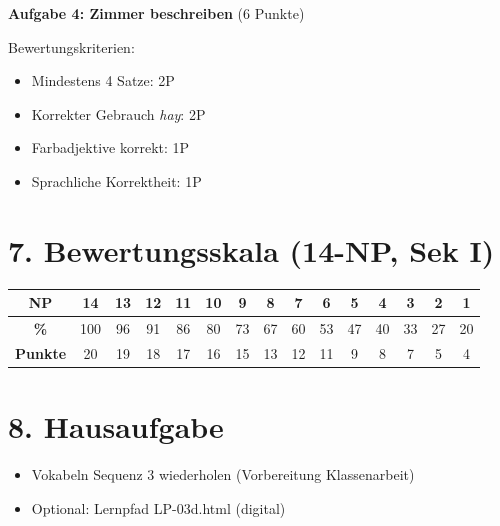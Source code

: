 \documentclass[11pt, a4paper]{article}
\begin{document}
\vspace{1em}

\textbf{Aufgabe 4: Zimmer beschreiben} (6 Punkte)

Bewertungskriterien:
\begin{itemize}
    \item Mindestens 4 Satze: 2P
    \item Korrekter Gebrauch \textit{hay}: 2P
    \item Farbadjektive korrekt: 1P
    \item Sprachliche Korrektheit: 1P
\end{itemize}


\section*{7. Bewertungsskala (14-NP, Sek I)}

\begin{center}
\begin{tabular}{|c|c|c|c|c|c|c|c|c|c|c|c|c|c|c|}
\hline
\textbf{NP} & 14 & 13 & 12 & 11 & 10 & 9 & 8 & 7 & 6 & 5 & 4 & 3 & 2 & 1 \\
\hline
\textbf{\%} & 100 & 96 & 91 & 86 & 80 & 73 & 67 & 60 & 53 & 47 & 40 & 33 & 27 & 20 \\
\hline
\textbf{Punkte} & 20 & 19 & 18 & 17 & 16 & 15 & 13 & 12 & 11 & 9 & 8 & 7 & 5 & 4 \\
\hline
\end{tabular}
\end{center}


\section*{8. Hausaufgabe}

\begin{itemize}
    \item Vokabeln Sequenz 3 wiederholen (Vorbereitung Klassenarbeit)
    \item Optional: Lernpfad LP-03d.html (digital)
\end{itemize}
\end{document}
